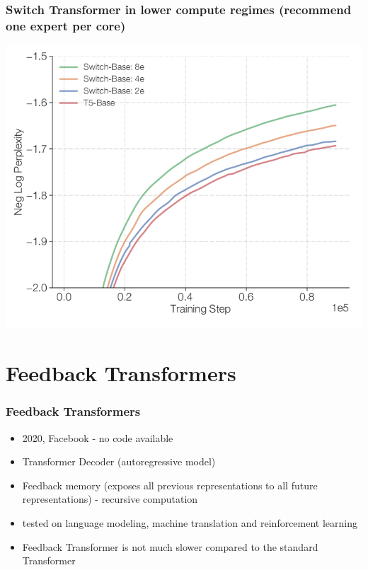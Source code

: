 \documentclass{beamer}
\begin{document}
\begin{frame}
    \frametitle{Switch Transformer in lower compute regimes (recommend one expert per core)}
    \begin{center}
        \includegraphics[scale=0.35]{img/switch_transformers_low_resources.png}
    \end{center}
\end{frame}



\section{Feedback Transformers}
\begin{frame}
    \frametitle{Feedback Transformers \cite{feedback_transformer}}
    \begin{itemize}
        \item 2020, Facebook - no code available
        \item Transformer Decoder (autoregressive model)
        \item Feedback memory (exposes all previous representations to all future representations) - recursive computation
        \item tested on language modeling, machine translation and reinforcement learning
        \item Feedback Transformer is not much slower compared to the standard Transformer
    \end{itemize}
\end{frame}
\end{document}
